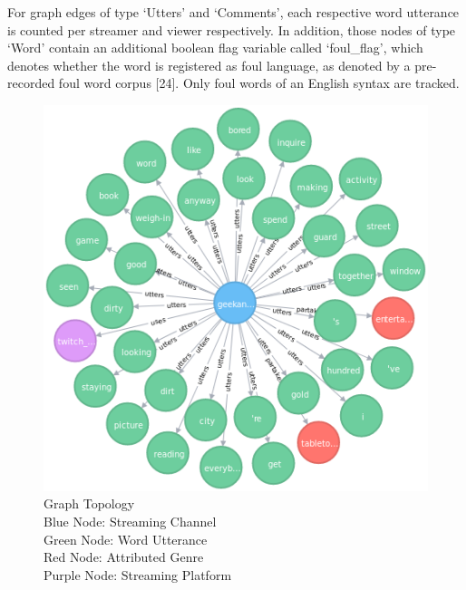 \documentclass[10pt,conference]{IEEEtran}
\begin{document}
For graph edges of type ‘Utters’ and ‘Comments’, each respective word utterance is counted per streamer and viewer respectively. In addition, those nodes of type ‘Word’ contain an additional boolean flag variable called ‘foul\_flag’, which denotes whether the word is registered as foul language, as denoted by a pre-recorded foul word corpus [24]. Only foul words of an English syntax are tracked.

\begin{figure}[h]
    \includegraphics[width=\linewidth]{GraphTopology.png}
    \captionsetup                     {justification=centering}
    \caption                          {Graph Topology\\Blue Node: Streaming Channel\\
                                       Green Node: Word Utterance\\Red Node: Attributed Genre\\Purple Node: Streaming Platform}
    \label                            {fig:GraphTopology}
\end{figure}
\end{document}
